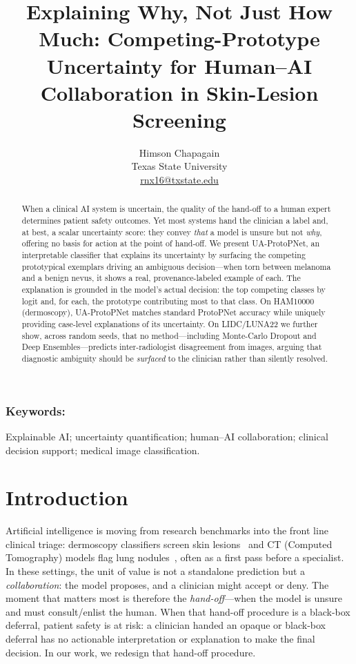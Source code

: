 \documentclass[10pt]{article}
\title{Explaining Why, Not Just How Much: Competing-Prototype Uncertainty
for Human--AI Collaboration in Skin-Lesion Screening}
\author{Himson Chapagain \\
  Texas State University \\
  {\underline{rnx16@txstate.edu}} \\ }
\date{}
\newcommand{\method}{UA-ProtoPNet}
\begin{document}
\maketitle

\begin{abstract}
When a clinical AI system is uncertain, the quality of the hand-off to a human
expert determines patient safety outcomes. Yet most systems hand the clinician
a label and, at best, a scalar uncertainty score: they convey \emph{that} a
model is unsure but not \emph{why}, offering no basis for action at the point
of hand-off. We present \method{}, an interpretable classifier that explains
its uncertainty by surfacing the competing prototypical exemplars driving an
ambiguous decision---when torn between melanoma and a benign nevus, it shows a
real, provenance-labeled example of each. The explanation is grounded in the
model's actual decision: the top competing classes by logit and, for each, the
prototype contributing most to that class. On HAM10000 (dermoscopy), \method{}
matches standard ProtoPNet accuracy while uniquely providing case-level
explanations of its uncertainty. On LIDC/LUNA22 we further show, across random
seeds, that no method---including Monte-Carlo Dropout and Deep
Ensembles---predicts inter-radiologist disagreement from images, arguing that
diagnostic ambiguity should be \emph{surfaced} to the clinician rather than
silently resolved.
\end{abstract}

\subsubsection*{Keywords:}

Explainable AI; uncertainty quantification; human--AI collaboration; clinical
decision support; medical image classification.


\section{Introduction}

Artificial intelligence is moving from research benchmarks into the front line
clinical triage: dermoscopy classifiers screen skin lesions~\cite{esteva2017dermatologist} and CT (Computed Tomography) models flag
lung nodules~\cite{setio2017luna}, often as a first pass before a specialist. In these settings, the
unit of value is not a standalone prediction but a \emph{collaboration}: the
model proposes, and a clinician might accept or deny. The moment that matters most is
therefore the \emph{hand-off}---when the model is unsure and must consult/enlist the
human. When that hand-off procedure is a black-box deferral, patient safety is at risk: a clinician
handed an opaque or black-box deferral has no actionable interpretation or explanation to make the final decision.
In our work, we redesign that hand-off procedure.
\end{document}
